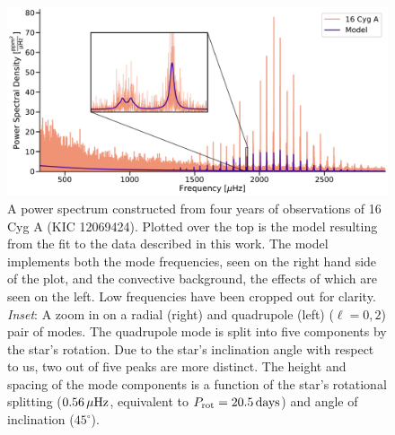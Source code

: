 \clearpage 
 \begin{figure}
 	\centering
 	\includegraphics[width=.99\textwidth]{Images/modelfit.pdf}
 	\caption{A power spectrum constructed from four years of \kepler observations of 16 Cyg A (KIC 12069424). Plotted over the top is the model resulting from the fit to the data described in this work. The model implements both the mode frequencies, seen on the right hand side of the plot, and the convective background, the effects of which are seen on the left. Low frequencies have been cropped out for clarity. \textit{Inset}: A zoom in on a radial (right) and quadrupole (left) ($\ell = 0, 2$) pair of modes. The quadrupole mode is split into five components by the star's rotation. Due to the star's inclination angle with respect to us, two out of five peaks are more distinct. The height and spacing of the mode components is a function of the star's rotational splitting ($0.56\, \mu\rm{Hz}$, equivalent to $P_{\rm rot} = 20.5\, \rm{days}$) and angle of inclination ($45^\circ$).}
 	\label{fig:modelfit}
 \end{figure}

